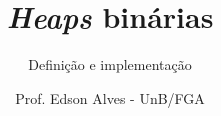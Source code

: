 \title{\textit{Heaps} binárias}
\subtitle{Definição e implementação}
\author{Prof. Edson Alves - UnB/FGA}
\date{}
